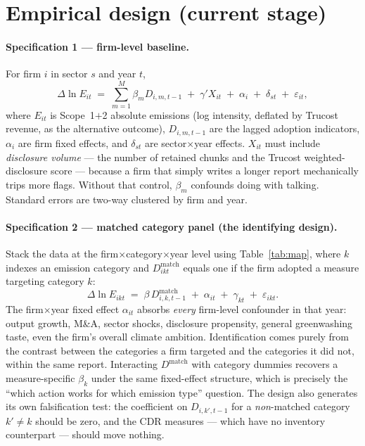 \documentclass[11pt]{article}
\begin{document}
\section{Empirical design (current stage)}

\paragraph{Specification 1 --- firm-level baseline.} For firm $i$ in sector
$s$ and year $t$,
\begin{equation}
\Delta \ln E_{it} \;=\; \sum_{m=1}^{M}\beta_m D_{i,m,t-1}
\;+\; \gamma' X_{it} \;+\; \alpha_i \;+\; \delta_{st} \;+\; \varepsilon_{it},
\end{equation}
where $E_{it}$ is Scope~1$+$2 absolute emissions (log intensity, deflated by
Trucost revenue, as the alternative outcome), $D_{i,m,t-1}$ are the lagged
adoption indicators, $\alpha_i$ are firm fixed effects, and $\delta_{st}$ are
sector$\times$year effects. $X_{it}$ must include \emph{disclosure volume} ---
the number of retained chunks and the Trucost weighted-disclosure score ---
because a firm that simply writes a longer report mechanically trips more
flags. Without that control, $\beta_m$ confounds doing with talking. Standard
errors are two-way clustered by firm and year.

\paragraph{Specification 2 --- matched category panel (the identifying design).}
Stack the data at the firm$\times$category$\times$year level using
Table~\ref{tab:map}, where $k$ indexes an emission category and $D^{\text{match}}_{ikt}$
equals one if the firm adopted a measure targeting category $k$:
\begin{equation}
\Delta \ln E_{ikt} \;=\; \beta\, D^{\text{match}}_{i,k,t-1}
\;+\; \alpha_{it} \;+\; \gamma_{kt} \;+\; \varepsilon_{ikt}.
\end{equation}
The firm$\times$year fixed effect $\alpha_{it}$ absorbs \emph{every}
firm-level confounder in that year: output growth, M\&A, sector shocks,
disclosure propensity, general greenwashing taste, even the firm's overall
climate ambition. Identification comes purely from the contrast between the
categories a firm targeted and the categories it did not, within the same
report. Interacting $D^{\text{match}}$ with category dummies recovers a
measure-specific $\beta_k$ under the same fixed-effect structure, which is
precisely the ``which action works for which emission type'' question.
The design also generates its own falsification test: the coefficient on
$D_{i,k',t-1}$ for a \emph{non}-matched category $k' \neq k$ should be zero,
and the CDR measures --- which have no inventory counterpart --- should move
nothing.
\end{document}
